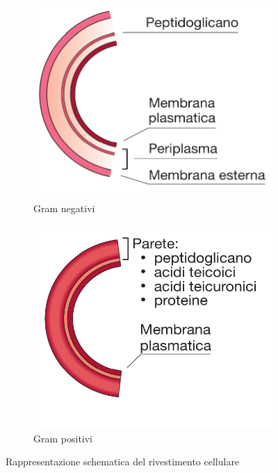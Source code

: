 \documentclass[../main.tex]{subfiles}
\begin{document}
\begin{figure}[h]
	\begin{subfigure}{0.5\linewidth}
		\includegraphics[keepaspectratio, width=\linewidth]{images/batterio_parete_neg.png}
		\caption{Gram negativi}
	\end{subfigure}
		\begin{subfigure}{0.5\linewidth}
		\includegraphics[keepaspectratio, width=\linewidth]{images/batterio_parete_pos.png}
		\caption{Gram positivi}
	\end{subfigure}
	\caption[Rappresentazione schematica del rivestimento cellulare]{
		Rappresentazione schematica del rivestimento cellulare \cite{deho_galli_2020}}
	\label{fig:bacteria_wall}
\end{figure}
\end{document}
